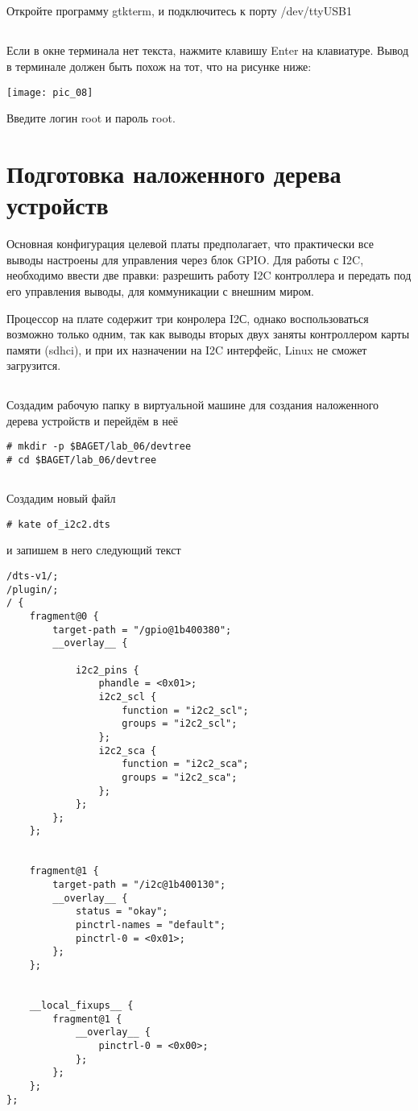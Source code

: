 \subsection{}Откройте программу gtkterm, и подключитесь к порту /dev/ttyUSB1

\subsection{}Если в окне терминала нет текста, нажмите клавишу Enter на клавиатуре. Вывод в терминале должен быть похож на тот, что на рисунке ниже:
\begin{center}
	\texttt{[image: pic\_08]}
\end{center}
Введите логин root и пароль root.

\section{Подготовка наложенного дерева устройств}

Основная конфигурация целевой платы предполагает, что практически все выводы настроены для управления через блок GPIO. Для работы с I2C, необходимо ввести две правки: разрешить работу I2C контроллера и передать под его управления выводы, для коммуникации с внешним миром.  

Процессор на плате содержит три конролера I2С, однако воспользоваться возможно только одним, так как выводы вторых двух заняты контроллером карты памяти (sdhci), и при их назначении на I2C интерфейс, Linux не сможет загрузится.

\subsection{} Создадим рабочую папку в виртуальной машине для создания наложенного дерева устройств и перейдём в неё 
\begin{lstlisting}[style=bash]
# mkdir -p $BAGET/lab_06/devtree
# cd $BAGET/lab_06/devtree 
\end{lstlisting}

\subsection{}Создадим новый файл
\begin{lstlisting}[style=bash]
# kate of_i2c2.dts
\end{lstlisting}
и запишем в него следующий текст
\begin{lstlisting}[style=stdout]
/dts-v1/;
/plugin/;
/ {
	fragment@0 {
		target-path = "/gpio@1b400380";
		__overlay__ {
			
			i2c2_pins {
				phandle = <0x01>;
				i2c2_scl {
					function = "i2c2_scl";
					groups = "i2c2_scl";
				};
				i2c2_sca {
					function = "i2c2_sca";
					groups = "i2c2_sca";
				};
			};
		};
	};
	
	
	fragment@1 { 
		target-path = "/i2c@1b400130"; 
		__overlay__ { 
			status = "okay"; 
			pinctrl-names = "default"; 
			pinctrl-0 = <0x01>; 
		}; 
	}; 
	
	
	__local_fixups__ {
		fragment@1 {
			__overlay__ {
				pinctrl-0 = <0x00>;
			};
		};	
	};
};
\end{lstlisting}

